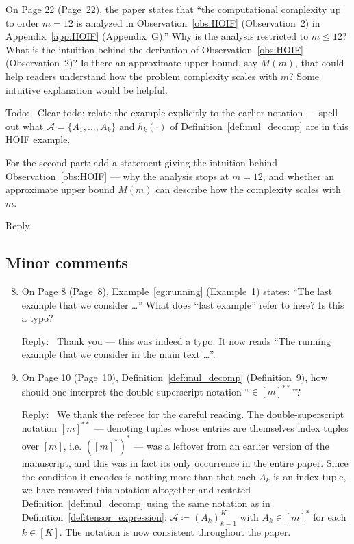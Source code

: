 \documentclass[12pt]{article}
\newenvironment{reply}{\par\smallskip\noindent\color{blue}Reply:\ \ignorespaces}{\par}
\newenvironment{todo}{\par\smallskip\noindent\color{red}Todo:\ \ignorespaces}{\par}
\theoremstyle{plain}
\theoremstyle{definition}
\def\calA{\mathcal{A}} \def\calB{\mathcal{B}} \def\calC{\mathcal{C}}
\begin{document}
\begin{enumerate}
On Page 22 (Page~22), the paper states that ``the computational complexity up to order $m = 12$ is analyzed in Observation~\ref{obs:HOIF} (Observation~2) in Appendix~\ref{app:HOIF} (Appendix~G).'' Why is the analysis restricted to $m \leq 12$? What is the intuition behind the derivation of Observation~\ref{obs:HOIF} (Observation~2)? Is there an approximate upper bound, say $M(m)$, that could help readers understand how the problem complexity scales with $m$? Some intuitive explanation would be helpful.
\begin{todo}
    Clear todo: relate the example explicitly to the earlier notation --- spell out what $\mathcal{A} = \{A_1, \ldots, A_k\}$ and $h_k(\cdot)$ of Definition~\ref{def:mul_decomp} are in this HOIF example.

    For the second part: add a statement giving the intuition behind Observation~\ref{obs:HOIF} --- why the analysis stops at $m = 12$, and whether an approximate upper bound $M(m)$ can describe how the complexity scales with $m$.
\end{todo}
\begin{reply}      \end{reply}

\end{enumerate}

\subsection*{Minor comments}

\begin{enumerate}
\setcounter{enumi}{7}

\item On Page 8 (Page~8), Example~\ref{eg:running} (Example~1) states: ``The last example that we consider \ldots'' What does ``last example'' refer to here? Is this a typo?

\begin{reply}
Thank you --- this was indeed a typo. It now reads ``The running example that we consider in the main text \ldots''.
\end{reply}

\item On Page 10 (Page~10), Definition~\ref{def:mul_decomp} (Definition~9), how should one interpret the double superscript notation ``$\in [m]^{**}$''?

\begin{reply}
We thank the referee for the careful reading. The double-superscript notation $[m]^{**}$ --- denoting tuples whose entries are themselves index tuples over $[m]$, i.e. $([m]^{*})^{*}$ --- was a leftover from an earlier version of the manuscript, and this was in fact its only occurrence in the entire paper. Since the condition it encodes is nothing more than that each $A_k$ is an index tuple, we have removed this notation altogether and restated Definition~\ref{def:mul_decomp} using the same notation as in Definition~\ref{def:tensor_expression}: $\calA \coloneqq (A_k)_{k=1}^{K}$ with $A_k \in [m]^{*}$ for each $k \in [K]$. The notation is now consistent throughout the paper.
\end{reply}

\end{enumerate}
\end{document}
